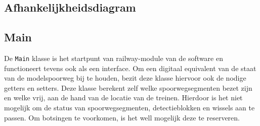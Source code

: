 \documentclass[a4paper, 11pt]{article}
\newcommand{\<}{\scriptsize\textless\normalsize}
\renewcommand{\>}{\scriptsize\textgreater\normalsize}
\begin{document}
\subsection{Afhankelijkheidsdiagram} %
\begin{center}
\end{center}

\subsection{Main} %
De \texttt{Main} klasse is het startpunt van railway-module van de software en functioneert tevens ook als een interface. Om een digitaal equivalent van de staat van de modelspoorweg bij te houden, bezit deze klasse hiervoor ook de nodige getters en setters. Deze klasse berekent zelf welke spoorwegsegmenten bezet zijn en welke vrij, aan de hand van de locatie van de treinen. Hierdoor is het niet mogelijk om de status van spoorwegsegmenten, detectieblokken en wissels aan te passen. Om botsingen te voorkomen, is het well mogelijk deze te reserveren.
\end{document}
